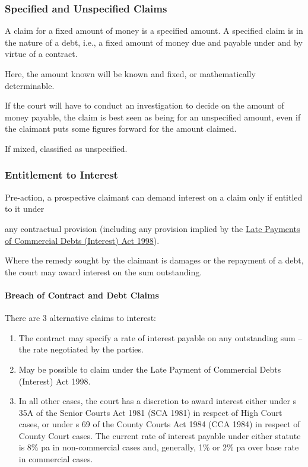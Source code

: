 \documentclass[
]{article}
\providecommand{\tightlist}{%
  \setlength{\itemsep}{0pt}\setlength{\parskip}{0pt}}
\begin{document}
\hypertarget{specified-and-unspecified-claims}{%
\subsubsection{Specified and Unspecified
Claims}\label{specified-and-unspecified-claims}}

A claim for a fixed amount of money is a specified amount. A specified
claim is in the nature of a debt, i.e., a fixed amount of money due and
payable under and by virtue of a contract.

Here, the amount known will be known and fixed, or mathematically
determinable.

If the court will have to conduct an investigation to decide on the
amount of money payable, the claim is best seen as being for an
unspecified amount, even if the claimant puts some figures forward for
the amount claimed.

If mixed, classified as unspecified.

\hypertarget{entitlement-to-interest}{%
\subsubsection{Entitlement to Interest}\label{entitlement-to-interest}}

Pre-action, a prospective claimant can demand interest on a claim only
if entitled to it under

any contractual provision (including any provision implied by the
\href{https://www.legislation.gov.uk/ukpga/1998/20/contents}{Late
Payments of Commercial Debts (Interest) Act 1998}).

Where the remedy sought by the claimant is damages or the repayment of a
debt, the court may award interest on the sum outstanding.

\hypertarget{breach-of-contract-and-debt-claims}{%
\paragraph{Breach of Contract and Debt
Claims}\label{breach-of-contract-and-debt-claims}}

There are 3 alternative claims to interest:

\begin{enumerate}
\def\labelenumi{\arabic{enumi}.}
\tightlist
\item
  The contract may specify a rate of interest payable on any outstanding
  sum -- the rate negotiated by the parties.
\item
  May be possible to claim under the Late Payment of Commercial Debts
  (Interest) Act 1998.
\item
  In all other cases, the court has a discretion to award interest
  either under s 35A of the Senior Courts Act 1981 (SCA 1981) in respect
  of High Court cases, or under s 69 of the County Courts Act 1984 (CCA
  1984) in respect of County Court cases. The current rate of interest
  payable under either statute is 8\% pa in non-commercial cases and,
  generally, 1\% or 2\% pa over base rate in commercial cases.
\end{enumerate}
\end{document}
